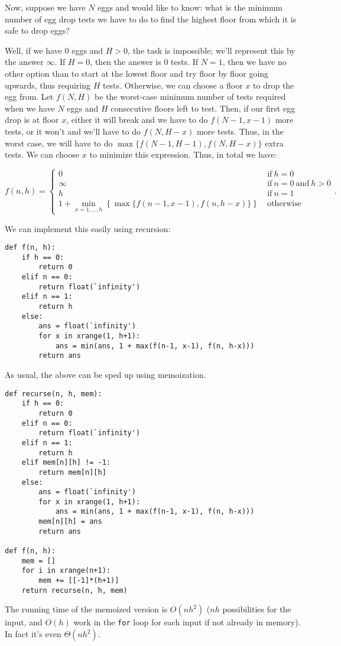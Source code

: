 \documentclass[11pt]{article}
\begin{document}
Now, suppose we have $N$ eggs and would like to know: what is the
minimum number of egg drop tests we have to do to find the highest
floor from which it is safe to drop eggs?

Well, if we have $0$ eggs and $H>0$, the
task is impossible; we'll represent this by the answer $\infty$.  If
$H=0$, then the answer is $0$ tests.  If $N=1$, then we have no other
option than to start at the lowest floor and try floor by floor going
upwards, thus requiring $H$ tests.  Otherwise, we can choose a floor
$x$ to drop the egg from.  Let $f(N, H)$ be the worst-case minimum
number of
tests required when we have $N$ eggs and $H$ consecutive floors left
to test.  Then, if our first egg drop is at floor $x$, either
it will break and we have to do $f(N-1, x-1)$ more tests, or it won't
and
we'll have to do $f(N, H - x)$ more tests.  Thus, in the worst case,
we
will have to do $\max\{f(N-1, H-1), f(N, H-x)\}$ extra tests.  We can
choose $x$ to minimize this expression.  Thus, in total we have:

$$f(n,h) =\begin{cases} 0 \ &
  \mathrm{if}\ h = 0 \\
\infty \ & \mathrm{if}\ n=0\ \mathrm{and}\ h>0\\
h \ & \mathrm{if}\ n=1\\
1 + \min_{x=1,\ldots,h}\left\{\max\{f(n-1,x-1),f(n,h-x)\}\right\}
\ &  \mathrm{otherwise} \end{cases} .
$$

We can implement this easily using recursion:

\begin{verbatim}
def f(n, h):
    if h == 0:
        return 0
    elif n == 0:
        return float(`infinity')
    elif n == 1:
        return h
    else:
        ans = float(`infinity')
        for x in xrange(1, h+1):
            ans = min(ans, 1 + max(f(n-1, x-1), f(n, h-x)))
        return ans
\end{verbatim}

As usual, the above can be sped up using memoization.

\begin{verbatim}
def recurse(n, h, mem):
    if h == 0:
        return 0
    elif n == 0:
        return float(`infinity')
    elif n == 1:
        return h
    elif mem[n][h] != -1:
        return mem[n][h]
    else:
        ans = float(`infinity')
        for x in xrange(1, h+1):
            ans = min(ans, 1 + max(f(n-1, x-1), f(n, h-x)))
        mem[n][h] = ans
        return ans

def f(n, h):
    mem = []
    for i in xrange(n+1):
        mem += [[-1]*(h+1)]
    return recurse(n, h, mem)
\end{verbatim}

The running time of the memoized version is $O(nh^2)$ ($nh$
possibilities for the input, and $O(h)$ work in the \texttt{for} loop
for each input if not already in memory).  In fact it's even
$\Theta(nh^2)$.
\end{document}
